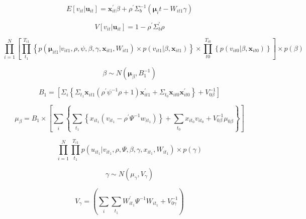 \documentclass[11pt]{jsarticle}
\begin{document}
\begin{equation}\label{formula39}
E[v_{it}|{\boldsymbol u}_{it}]=\textbf{x}_{it}^{'}\beta+\rho^{'}\Sigma_{b}^{-1}({\boldsymbol\mu}_it-W_{it1}\gamma)
\end{equation}

\begin{equation}\label{formula40}
V[v_{it}|{\boldsymbol u}_{it}] = 1-\rho^{'}\Sigma_{b}^{'}\rho
\end{equation}

\begin{equation}\label{formula41}
\prod_{i=1}^{N}\left[
 \prod_{t_{1}}^{T_{i1}}\left\{
  p({\boldsymbol\mu}_{it1}|v_{it1},\rho,\psi,\beta,\gamma,\textbf{x}_{it1},W_{it1})
  ×p(v_{it1}|\beta,\textbf{x}_{it1})
 \right\}
 ×\prod_{t0}^{T_{i0}}\left\{
  p(v_{it0}|\beta,\textbf{x}_{it0})
 \right\}
\right]
×p(\beta)
\end{equation}

\begin{equation}\label{formula42}
\beta \sim N({\boldsymbol\mu}_{\beta},B_{1}^{-1})
\end{equation}

\begin{equation}\label{formula43}
B_{1} = \left[
 \Sigma_{i}\left\{
  \Sigma_{t_{1}}\textbf{x}_{it1}(\rho^{'}\psi^{-1}\rho+1)\textbf{x}_{it1}^{'}
  +\Sigma_{t_{0}}\textbf{x}_{it0}\textbf{x}_{it0}^{'}
 \right\}
 +V_{0\beta}^{-1}
\right]
\end{equation}


\begin{equation} \label{formula44}
\mu_{\beta} = B_{1} \times
\left[
\sum_{\substack{i}}
\left\{
\sum_{\substack{t_{1}}}
\left\{
x_{it_{1}} (v_{it_{1}} - \rho^{\prime} \Psi^{-1} w_{it_{1}})
\right\} + \sum_{\substack{t_{0}}} x_{it_{0}} v_{it_{0}} + V^{-1}_{0\beta} \mu_{0\beta}
\right\}
\right]
\end{equation}

\begin{equation} \label{formula45}
\prod_{i=1}^{N} \prod_{t_{1}}^{T_{i1}} p(u_{it_{1}} | v_{it_{1}}, \rho, \Psi, \beta, \gamma, x_{it_{1}}, W_{it_{1}}) \times p(\gamma)
\end{equation}

\begin{equation} \label{formula46}
\gamma \sim N(\mu_{\gamma}, V_{\gamma})
\end{equation}

\begin{equation} \label{formula47}
V_{\gamma} = 
\left(
\sum_{\substack{i}} \sum_{\substack{t_{1}}} W^{\prime}_{it_{1}} \Psi^{-1} W_{it_{1}} + V^{-1}_{0\gamma}
\right)
\end{equation}
\end{document}
